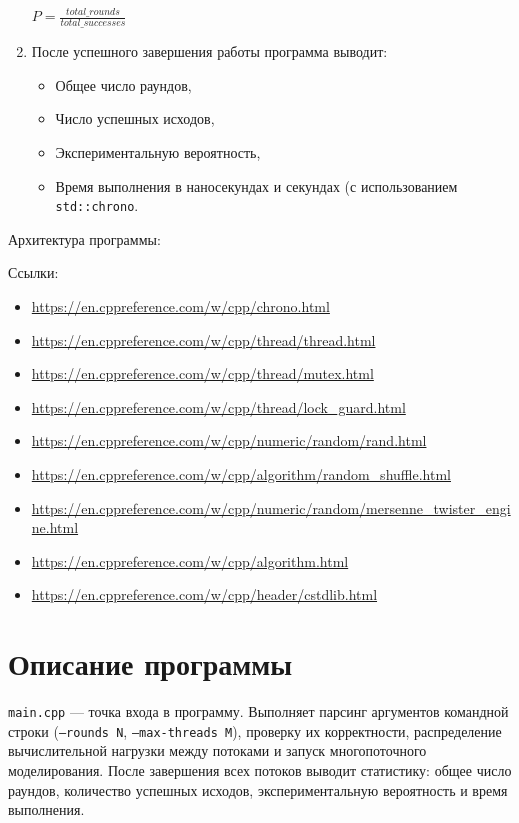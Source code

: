 \begin{enumerate}
\begin{center}
$P = \frac{total\_rounds}{total\_successes}$
\end{center}
\item После успешного завершения работы программа выводит:
\begin{itemize}
    \item Общее число раундов,
    \item Число успешных исходов,
    \item Экспериментальную вероятность,
    \item Время выполнения в наносекундах и секундах (с использованием \texttt{std::chrono}.
\end{itemize}
\end{enumerate}
\pagebreak
Архитектура программы:


Ссылки:

\begin{itemize}
\item \url{https://en.cppreference.com/w/cpp/chrono.html}
\item \url{https://en.cppreference.com/w/cpp/thread/thread.html}
\item \url{https://en.cppreference.com/w/cpp/thread/mutex.html}
\item \url{https://en.cppreference.com/w/cpp/thread/lock_guard.html}
\item \url{https://en.cppreference.com/w/cpp/numeric/random/rand.html}
\item \url{https://en.cppreference.com/w/cpp/algorithm/random_shuffle.html}
\item \url{https://en.cppreference.com/w/cpp/numeric/random/mersenne_twister_engine.html}
\item \url{https://en.cppreference.com/w/cpp/algorithm.html}
\item \url{https://en.cppreference.com/w/cpp/header/cstdlib.html}
\end{itemize}

\section{Описание программы}

\texttt{main.cpp} --- точка входа в программу. Выполняет парсинг аргументов командной строки (\texttt{--rounds N}, \texttt{--max-threads M}), проверку их корректности, распределение вычислительной нагрузки между потоками и запуск многопоточного моделирования. После завершения всех потоков выводит статистику: общее число раундов, количество успешных исходов, экспериментальную вероятность и время выполнения.


